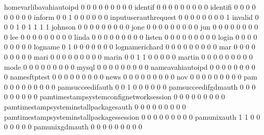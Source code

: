 \documentclass[compress,8pt]{beamer}
\begin{document}
\begin{frame}
\begin{Schunk}
  homevarlibavahiautoipd                     0   0   0   0   0   0   0   0   0
  identif                                    0   0   0   0   0   0   0   0   0
  identifi                                   0   0   0   0   0   0   0   0   0
  inform                                     0   0   1   0   0   0   0   0   0
  inputuserauthrequest                       0   0   0   0   0   0   0   0   1
  invalid                                    0   0   0   1   0   1   1   1   1
  johnson                                    0   0   0   0   0   0   0   0   0
  jone                                       0   0   0   0   0   0   0   0   0
  jun                                        0   0   0   0   0   0   0   0   0
  lee                                        0   0   0   0   0   0   0   0   0
  linda                                      0   0   0   0   0   0   0   0   0
  listen                                     0   0   0   0   0   0   0   0   0
  login                                      0   0   0   0   0   0   0   0   0
  logname                                    0   1   0   0   0   0   0   0   0
  lognamerichard                             0   0   0   0   0   0   0   0   0
  mar                                        0   0   0   0   0   0   0   0   0
  mari                                       0   0   0   0   0   0   0   0   0
  marin                                      0   0   1   1   0   0   0   0   0
  martin                                     0   0   0   0   0   0   0   0   0
  mode                                       0   0   0   0   0   0   0   0   0
  mysql                                      0   0   0   0   0   0   0   0   0
  nameavahiautoipd                           0   0   0   0   0   0   0   0   0
  namesftptest                               0   0   0   0   0   0   0   0   0
  news                                       0   0   0   0   0   0   0   0   0
  nov                                        0   0   0   0   0   0   0   0   0
  pam                                        0   0   0   0   0   0   0   0   0
  pamsucceedifauth                           0   0   1   0   0   0   0   0   0
  pamsucceedifgdmauth                        0   0   0   0   0   0   0   0   0
  pamtimestampsystemconfignetworksession     0   0   0   0   0   0   0   0   0
  pamtimestampsysteminstallpackagesauth      0   0   0   0   0   0   0   0   0
  pamtimestampsysteminstallpackagessession   0   0   0   0   0   0   0   0   0
  pamunixauth                                1   1   0   0   0   0   0   0   0
  pamunixgdmauth                             0   0   0   0   0   0   0   0   0

\end{Schunk}
\end{frame}
\end{document}
